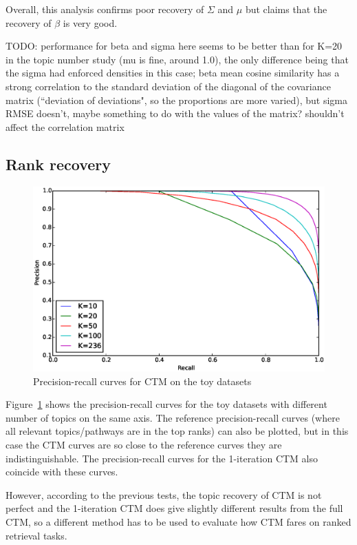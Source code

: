 \documentclass[12pt,a4paper,twoside,openright]{report}
\begin{document}
Overall, this analysis confirms poor recovery of $\Sigma$ and $\mu$ but claims that the recovery of $\beta$ is very good.

TODO: performance for beta and sigma here seems to be better than for K=20 in the topic number study (mu is fine, around 1.0), the only difference being that the sigma had enforced densities in this case; beta mean cosine similarity has a strong correlation to the standard deviation of the diagonal of the covariance matrix (``deviation of deviations", so the proportions are more varied), but sigma RMSE doesn't, maybe something to do with the values of the matrix? shouldn't affect the correlation matrix

\subsection{Rank recovery}

\begin{figure}[!htb]
\includegraphics[width=\textwidth]{sim-pr-curves-all.eps}
\caption{Precision-recall curves for CTM on the toy datasets}
\label{fig:sim-pr-curves-all}
\end{figure}

Figure~\ref{fig:sim-pr-curves-all} shows the precision-recall curves for the toy datasets with different number of topics on the same axis. The reference precision-recall curves (where all relevant topics/pathways are in the top ranks) can also be plotted, but in this case the CTM curves are so close to the reference curves they are indistinguishable. The precision-recall curves for the 1-iteration CTM also coincide with these curves.

However, according to the previous tests, the topic recovery of CTM is not perfect and the 1-iteration CTM does give slightly different results from the full CTM, so a different method has to be used to evaluate how CTM fares on ranked retrieval tasks.
\end{document}
